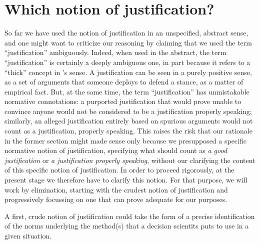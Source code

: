 \documentclass[preprint, french, english, 11pt, authoryear]{elsarticle}%
\begin{document}
\section{Which notion of justification?}
So far we have used the notion of justification in an unspecified, abstract sense, and one might want to criticize our reasoning by claiming that we used the term ``justification'' ambiguously. Indeed, when used in the abstract, the term ``justification'' is certainly a deeply ambiguous one, in part because it refers to a ``thick'' concept in \citet{williams_ethics_1985}'s sense. A justification can be seen in a purely positive sense, as a set of arguments that someone deploys to defend a stance, as a matter of empirical fact. But, at the same time, the term ``justification'' has unmistakable normative connotations: a purported justification that would prove unable to convince anyone would not be considered to be a justification properly speaking; similarly, an alleged justification entirely based on spurious arguments would not count as a justification, properly speaking. This raises the risk that our rationale in the former section might made sense only because we presupposed a specific normative notion of justification, specifying what should count as \emph{a good justification} or \emph{a justification properly speaking}, without our clarifying the content of this specific notion of justification. In order to proceed rigorously, at the present stage we therefore have to clarify this notion. For that purpose, we will work by elimination, starting with the crudest notion of justification and progressively focussing on one that can prove adequate for our purposes.

A first, crude notion of justification could take the form of a precise identification of the norms underlying the method(s) that a decision scientits puts to use in a given situation.
\end{document}
